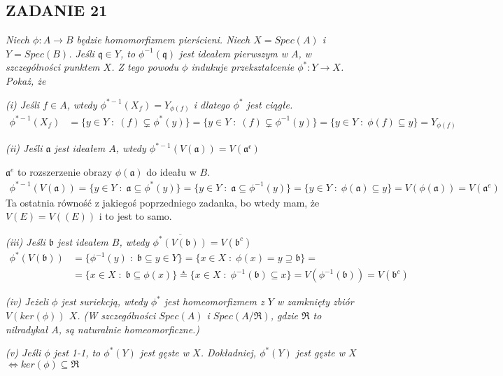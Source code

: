\documentclass{article}
\begin{document}
\subsection*{ZADANIE 21}
\emph{\color{pink}Niech $\phi:A\to B$ będzie homomorfizmem pierścieni. Niech $X=Spec(A)$ i $Y=Spec(B)$. Jeśli $\mathfrak{q}\in Y$, to $\phi^{-1}(\mathfrak{q})$ jest ideałem pierwszym w $A$, w szczególności punktem $X$. Z tego powodu $\phi$ indukuje przekształcenie $\phi^*:Y\to X$. Pokaż, że}

\emph{\color{pink}(i) Jeśli $f\in A$, wtedy $\phi^{*-1}(X_f)=Y_{\phi(f)}$ i dlatego $\phi^*$ jest ciągłe.}
\begin{align*}
    \phi^{*-1}(X_f)&=\{y\in Y\;:\;(f)\subsetneq\phi^*(y)\}=\{y\in Y\;:\;(f)\subsetneq\phi^{-1}(y)\}=\{y\in Y\;:\;\phi(f)\subseteq y\}=Y_{\phi(f)}
\end{align*}

\emph{\color{pink}(ii) Jeśli $\mathfrak{a}$ jest ideałem $A$, wtedy $\phi^{*-1}(V(\mathfrak{a}))=V(\mathfrak{a^e})$ }

$\mathfrak{a}^e$ to rozszerzenie obrazy $\phi(\mathfrak{a})$ do ideału w $B$.
\begin{align*}
    \phi^{*-1}(V(\mathfrak{a}))=\{y\in Y\;:\;\mathfrak{a}\subseteq \phi^*(y)\}=\{y\in Y\;:\;\mathfrak{a}\subseteq\phi^{-1}(y)\}=\{y\in Y\;:\;\phi(\mathfrak{a})\subseteq y\}=V(\phi(\mathfrak{a}))=V(\mathfrak{a}^e)
\end{align*}
Ta ostatnia równość z jakiegoś poprzedniego zadanka, bo wtedy mam, że $V(E)=V((E))$ i to jest to samo.

\emph{\color{pink}(iii) Jeśli $\mathfrak{b}$ jest ideałem $B$, wtedy $\overline{\phi^*(V(\mathfrak{b}))}=V(\mathfrak{b}^c)$}
\begin{align*}
    \phi^*(V(\mathfrak{b}))&=\{\phi^{-1}(y)\;:\;\mathfrak{b}\subseteq y\in Y\}=\{x\in X\;:\;\phi(x)=y\supseteq \mathfrak{b}\}=\\
    &=\{x\in X\;:\;\mathfrak{b}\subseteq\phi(x)\}\overset{\star}{=}\{x\in X\;:\;\phi^{-1}(\mathfrak{b})\subseteq x\}=V(\phi^{-1}(\mathfrak{b}))=V(\mathfrak{b}^c)
\end{align*}

\emph{\color{yellow}(iv) Jeżeli $\phi$ jest suriekcją, wtedy $\phi^*$ jest homeomorfizmem z $Y$ w zamknięty zbiór $V(ker(\phi))$ $X$. (W szczególności $Spec(A)$ i $Spec(A/\mathfrak{R})$, gdzie $\mathfrak{R}$ to nilradykał $A$, są naturalnie homeomorficzne.)}


\emph{\color{yellow}(v) Jeśli $\phi$ jest 1-1, to $\phi^*(Y)$ jest gęste w $X$. Dokładniej, $\phi^*(Y)$ jest gęste w $X$ $\iff ker(\phi)\subseteq\mathfrak{R}$}
\end{document}
